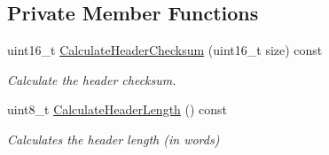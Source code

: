 \subsection*{Private Member Functions}
\begin{DoxyCompactItemize}
\item 
uint16\+\_\+t \hyperlink{classns3_1_1TcpHeader_ae1e83c9fd04d4eb45374c1b9a8425b50}{Calculate\+Header\+Checksum} (uint16\+\_\+t size) const 
\begin{DoxyCompactList}\small\item\em Calculate the header checksum. \end{DoxyCompactList}\item 
uint8\+\_\+t \hyperlink{classns3_1_1TcpHeader_a8e952fc624e3e2fcbcfc8f94cc396ecf}{Calculate\+Header\+Length} () const 
\begin{DoxyCompactList}\small\item\em Calculates the header length (in words) \end{DoxyCompactList}\end{DoxyCompactItemize}
